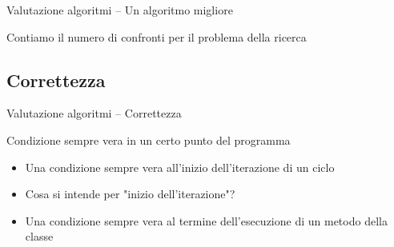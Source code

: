 \begin{frame}[shrink=10]{Valutazione algoritmi -- Un algoritmo migliore}

\begin{mybox}
Contiamo il numero di confronti per il problema della \alert{ricerca}
\end{mybox}

\vspace{-12pt}

\end{frame}



\subsection{Correttezza}

\begin{frame}{Valutazione algoritmi -- Correttezza}

\begin{myboxtitle}[Invariante]
Condizione sempre vera in un certo punto del programma
\end{myboxtitle}

\begin{myboxtitle}
\begin{itemize}
\item Una condizione sempre vera all'inizio dell'iterazione di un ciclo
\item Cosa si intende per "inizio dell'iterazione"?
\end{itemize}
\end{myboxtitle}

\begin{myboxtitle}
\begin{itemize}
\item Una condizione sempre vera al termine dell'esecuzione di un metodo della classe
\end{itemize}
\end{myboxtitle}

\end{frame}

